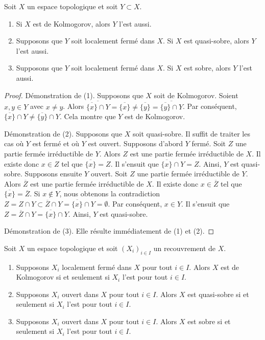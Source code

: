\begin{lemma}
\label{lemma-sober-subspace}
Soit $X$ un espace topologique et soit $Y\subset X$.
\begin{enumerate}
\item Si $X$ est de Kolmogorov, alors $Y$ l'est aussi.
\item Supposons que $Y$ soit localement fermé dans $X$. Si $X$ est
quasi-sobre, alors $Y$ l'est aussi.
\item Supposons que $Y$ soit localement fermé dans $X$. Si $X$ est sobre,
alors $Y$ l'est aussi.
\end{enumerate}
\end{lemma}

\begin{proof}
Démonstration de (1). Supposons que $X$ soit de Kolmogorov. Soient
$x,y\in Y$ avec $x\neq y$. Alors
$\overline{\overline{\{x\}}\cap Y}=\overline{\{x\}}\neq\overline{\{y\}}=
\overline{\overline{\{y\}}\cap Y}$. Par conséquent,
$\overline{\{x\}}\cap Y\neq\overline{\{y\}}\cap Y$. Cela montre que $Y$ est
de Kolmogorov.

\medskip\noindent
Démonstration de (2). Supposons que $X$ soit quasi-sobre. Il suffit de traiter
les cas où $Y$ est fermé et où $Y$ est ouvert. Supposons d'abord $Y$ fermé.
Soit $Z$ une partie fermée irréductible de $Y$. Alors $Z$ est une partie fermée
irréductible de $X$. Il existe donc $x \in Z$ tel que
$\overline{\{x\}} = Z$. Il s'ensuit que $\overline{\{x\}} \cap Y = Z$.
Ainsi, $Y$ est quasi-sobre. Supposons ensuite $Y$ ouvert. Soit $Z$ une partie
fermée irréductible de $Y$. Alors $\overline{Z}$ est une partie fermée
irréductible de $X$. Il existe donc $x \in \overline{Z}$ tel que
$\overline{\{x\}}=\overline{Z}$. Si $x\notin Y$, nous obtenons la
contradiction
$Z=Z\cap Y\subset\overline{Z}\cap Y=\overline{\{x\}}\cap Y=\emptyset$.
Par conséquent, $x\in Y$. Il s'ensuit que
$Z=\overline{Z}\cap Y=\overline{\{x\}}\cap Y$. Ainsi, $Y$ est quasi-sobre.

\medskip\noindent
Démonstration de (3). Elle résulte immédiatement de (1) et (2).
\end{proof}

\begin{lemma}
\label{lemma-sober-local}
Soit $X$ un espace topologique et soit $(X_i)_{i\in I}$ un recouvrement de
$X$.
\begin{enumerate}
\item Supposons $X_i$ localement fermé dans $X$ pour tout $i\in I$. Alors $X$
est de Kolmogorov si et seulement si $X_i$ l'est pour tout $i\in I$.
\item Supposons $X_i$ ouvert dans $X$ pour tout $i\in I$. Alors $X$ est
quasi-sobre si et seulement si $X_i$ l'est pour tout $i\in I$.
\item Supposons $X_i$ ouvert dans $X$ pour tout $i\in I$. Alors $X$ est sobre
si et seulement si $X_i$ l'est pour tout $i\in I$.
\end{enumerate}
\end{lemma}

